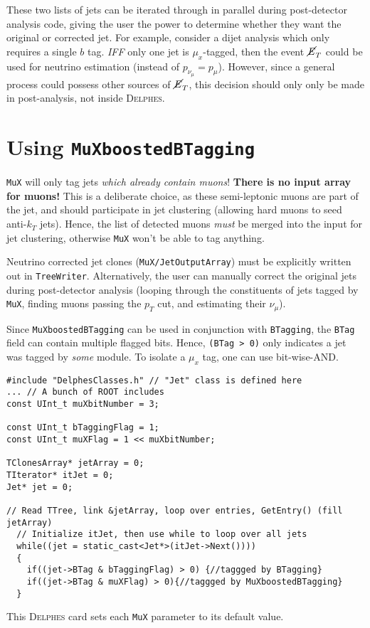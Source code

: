 \documentclass[10pt]{article}
\newcommand{\muX}{$\mu_{x}^{}$}
\newcommand{\muXmodFull}{\texttt{MuXboostedBTagging}}
\newcommand{\muXmod}{\texttt{MuX}}
\newcommand{\delphes}{\textsc{Delphes}}
\newcommand{\pT}{p_{T}^{}}
\newcommand{\MET}{\cancel{E}_{T}^{}}
\newcommand{\pMu}[1][]     {p_{\mu}^{#1}}
\newcommand{\pNu}[1][]     {p_{\nu_{\mu}}^{#1}}
\begin{document}
These two lists of jets can be iterated through in parallel during
post-detector analysis code, giving the user the power to determine whether 
they want the original or corrected jet. For example, consider a dijet analysis 
which only requires a single $b$ tag. \emph{IFF} only one jet is {\muX}-tagged, 
then the event $\MET$ could be used for neutrino estimation (instead of $\pNu=\pMu$).
However, since a general process could possess other sources of $\MET$, this
decision should only only be made in post-analysis, not inside {\delphes}.

\section{Using {\muXmodFull}}

{\muXmod} will only tag jets \emph{which already contain muons}!
\textbf{There is no input array for muons!} This is a deliberate choice,
as these semi-leptonic muons are part of the jet, and should participate in jet 
clustering (allowing hard muons to seed anti-$k_T$ jets). Hence, 
the list of detected muons \emph{must} be merged into the input for 
jet clustering, otherwise {\muXmod} won't be able to tag anything.

Neutrino corrected jet clones (\texttt{MuX/JetOutputArray}) must be 
explicitly written out in \texttt{TreeWriter}. Alternatively, 
the user can manually correct the original jets during post-detector 
analysis (looping through the constituents of jets tagged by {\muXmod},
finding muons passing the $\pT$ cut, and estimating their $\nu_{\mu}$).

Since {\muXmodFull} can be used in conjunction with \texttt{BTagging}, the
\texttt{BTag} field can contain multiple flagged bits. Hence, 
\texttt{(BTag > 0)} only indicates a jet was tagged by \emph{some} module. 
To isolate a {\muX} tag, one can use bit-wise-AND.

\begin{lstlisting}
#include "DelphesClasses.h" // "Jet" class is defined here
... // A bunch of ROOT includes
const UInt_t muXbitNumber = 3;

const UInt_t bTaggingFlag = 1;
const UInt_t muXFlag = 1 << muXbitNumber;

TClonesArray* jetArray = 0;
TIterator* itJet = 0;
Jet* jet = 0;

// Read TTree, link &jetArray, loop over entries, GetEntry() (fill jetArray)
  // Initialize itJet, then use while to loop over all jets 
  while((jet = static_cast<Jet*>(itJet->Next())))
  {
    if((jet->BTag & bTaggingFlag) > 0) {//taggged by BTagging}
    if((jet->BTag & muXFlag) > 0){//taggged by MuXboostedBTagging}
  }
\end{lstlisting}
%
This {\delphes} card sets each {\muXmod} parameter to its default value.
%
\end{document}
